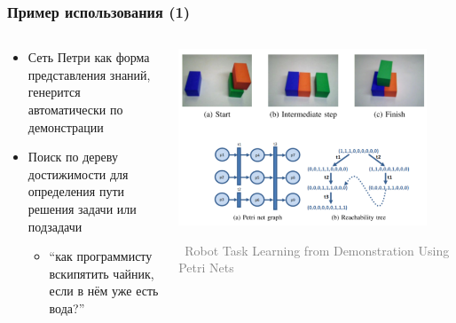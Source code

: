 \documentclass[xetex,mathserif,serif]{beamer}
\newcommand{\attribution}[1] {
	\vspace{-5mm}\begin{flushright}\begin{scriptsize}\textcolor{gray}{\textcopyright\, #1}\end{scriptsize}\end{flushright}
}
\begin{document}
	\begin{frame}
		\frametitle{Пример использования (1)}
		\begin{columns}
			\begin{column}{0.5\textwidth}
				\begin{itemize}
					\item Сеть Петри как форма представления знаний, генерится автоматически по демонстрации
					\item Поиск по дереву достижимости для определения пути решения задачи или подзадачи
					\begin{itemize}
						\item ``как программисту вскипятить чайник, если в нём уже есть вода?''
					\end{itemize}
				\end{itemize}
			\end{column}
			\begin{column}{0.5\textwidth}
				\begin{center}
					\includegraphics[width=0.9\textwidth]{petriUsageExample1.png}
					\attribution{Robot Task Learning from Demonstration Using Petri Nets}
				\end{center}
			\end{column}
		\end{columns}
	\end{frame}
\end{document}
